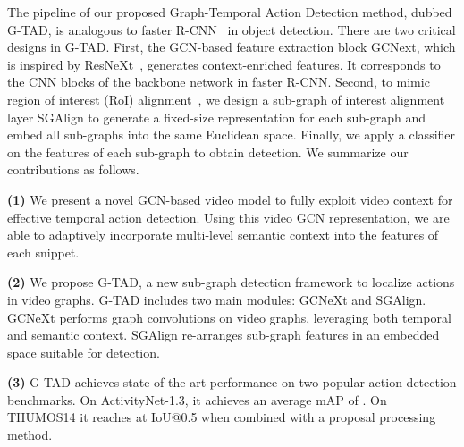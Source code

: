 \documentclass[10pt,twocolumn,letterpaper]{article}
\begin{document}
The pipeline of our proposed Graph-Temporal Action Detection method, dubbed  G-TAD, is analogous to faster R-CNN~\cite{girshick2015fast, ren2015faster} in object detection. There are two critical designs in G-TAD. First, the GCN-based feature extraction block GCNext, which is inspired by ResNeXt~\cite{xie2017aggregated},  generates context-enriched features. It corresponds to the CNN blocks of the backbone network in faster R-CNN. Second, to mimic region of interest (RoI) alignment~\cite{he2017mask}, we design a sub-graph of interest alignment layer SGAlign to generate a fixed-size representation for each sub-graph and embed all sub-graphs into the same Euclidean space. Finally, we apply a classifier on the features of each sub-graph to obtain detection.  We summarize our contributions as follows.






































\noindent
\textbf{(1)}  We present a novel GCN-based video model to fully exploit video context for effective temporal action detection. Using this video GCN representation, we are able to adaptively incorporate multi-level semantic context into the features of each snippet.

\noindent
\textbf{(2)} We propose G-TAD, a new sub-graph detection framework to localize actions in video graphs. G-TAD includes two main modules: GCNeXt and SGAlign. GCNeXt performs graph convolutions on video graphs, leveraging both temporal and semantic context. SGAlign re-arranges sub-graph features in an embedded space suitable for detection.


\noindent
\textbf{(3)} G-TAD achieves state-of-the-art performance on two popular action detection benchmarks. On ActivityNet-1.3, it achieves an average mAP of . On THUMOS14 it reaches  at IoU@0.5 when combined with a proposal processing method. 
\end{document}

